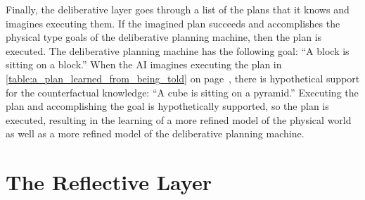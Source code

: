 Finally, the deliberative layer goes through a list of the plans that
it knows and imagines executing them.  If the imagined plan succeeds
and accomplishes the physical type goals of the deliberative planning
machine, then the plan is executed.  The deliberative planning machine
has the following goal: ``A block is sitting on a block.''  When the
AI imagines executing the plan in
{\mbox{\autoref{table:a_plan_learned_from_being_told}}} on
{\mbox{page~\pageref{table:a_plan_learned_from_being_told}}}, there is
hypothetical support for the counterfactual knowledge: ``A cube is
sitting on a pyramid.''  Executing the plan and accomplishing the goal
is hypothetically supported, so the plan is executed, resulting in the
learning of a more refined model of the physical world as well as a
more refined model of the deliberative planning machine.

\section{The Reflective Layer}

